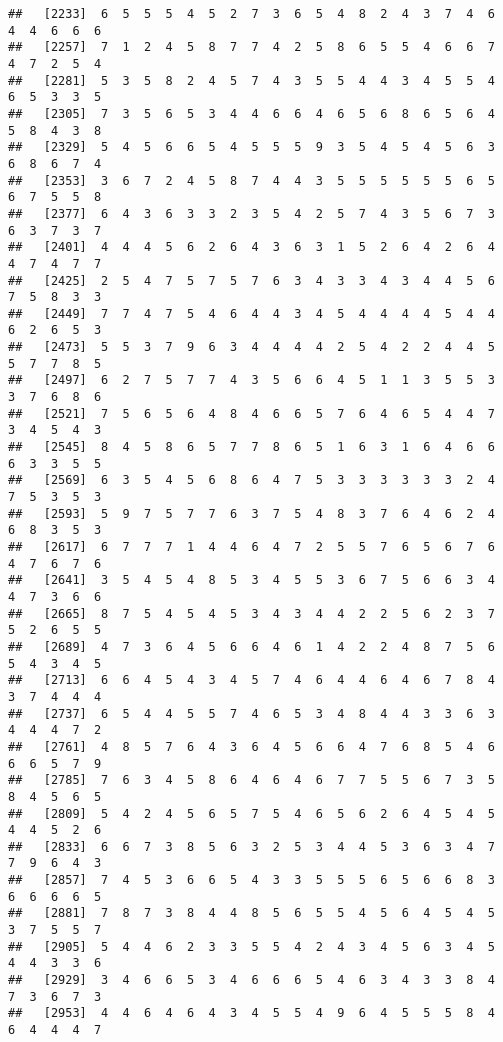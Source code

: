 \documentclass[
]{book}
\begin{document}
\begin{verbatim}
##   [2233]  6  5  5  5  4  5  2  7  3  6  5  4  8  2  4  3  7  4  6  4  4  6  6  6
##   [2257]  7  1  2  4  5  8  7  7  4  2  5  8  6  5  5  4  6  6  7  4  7  2  5  4
##   [2281]  5  3  5  8  2  4  5  7  4  3  5  5  4  4  3  4  5  5  4  6  5  3  3  5
##   [2305]  7  3  5  6  5  3  4  4  6  6  4  6  5  6  8  6  5  6  4  5  8  4  3  8
##   [2329]  5  4  5  6  6  5  4  5  5  5  9  3  5  4  5  4  5  6  3  6  8  6  7  4
##   [2353]  3  6  7  2  4  5  8  7  4  4  3  5  5  5  5  5  5  6  5  6  7  5  5  8
##   [2377]  6  4  3  6  3  3  2  3  5  4  2  5  7  4  3  5  6  7  3  6  3  7  3  7
##   [2401]  4  4  4  5  6  2  6  4  3  6  3  1  5  2  6  4  2  6  4  4  7  4  7  7
##   [2425]  2  5  4  7  5  7  5  7  6  3  4  3  3  4  3  4  4  5  6  7  5  8  3  3
##   [2449]  7  7  4  7  5  4  6  4  4  3  4  5  4  4  4  4  5  4  4  6  2  6  5  3
##   [2473]  5  5  3  7  9  6  3  4  4  4  4  2  5  4  2  2  4  4  5  5  7  7  8  5
##   [2497]  6  2  7  5  7  7  4  3  5  6  6  4  5  1  1  3  5  5  3  3  7  6  8  6
##   [2521]  7  5  6  5  6  4  8  4  6  6  5  7  6  4  6  5  4  4  7  3  4  5  4  3
##   [2545]  8  4  5  8  6  5  7  7  8  6  5  1  6  3  1  6  4  6  6  6  3  3  5  5
##   [2569]  6  3  5  4  5  6  8  6  4  7  5  3  3  3  3  3  3  2  4  7  5  3  5  3
##   [2593]  5  9  7  5  7  7  6  3  7  5  4  8  3  7  6  4  6  2  4  6  8  3  5  3
##   [2617]  6  7  7  7  1  4  4  6  4  7  2  5  5  7  6  5  6  7  6  4  7  6  7  6
##   [2641]  3  5  4  5  4  8  5  3  4  5  5  3  6  7  5  6  6  3  4  4  7  3  6  6
##   [2665]  8  7  5  4  5  4  5  3  4  3  4  4  2  2  5  6  2  3  7  5  2  6  5  5
##   [2689]  4  7  3  6  4  5  6  6  4  6  1  4  2  2  4  8  7  5  6  5  4  3  4  5
##   [2713]  6  6  4  5  4  3  4  5  7  4  6  4  4  6  4  6  7  8  4  3  7  4  4  4
##   [2737]  6  5  4  4  5  5  7  4  6  5  3  4  8  4  4  3  3  6  3  4  4  4  7  2
##   [2761]  4  8  5  7  6  4  3  6  4  5  6  6  4  7  6  8  5  4  6  6  6  5  7  9
##   [2785]  7  6  3  4  5  8  6  4  6  4  6  7  7  5  5  6  7  3  5  8  4  5  6  5
##   [2809]  5  4  2  4  5  6  5  7  5  4  6  5  6  2  6  4  5  4  5  4  4  5  2  6
##   [2833]  6  6  7  3  8  5  6  3  2  5  3  4  4  5  3  6  3  4  7  7  9  6  4  3
##   [2857]  7  4  5  3  6  6  5  4  3  3  5  5  5  6  5  6  6  8  3  6  6  6  6  5
##   [2881]  7  8  7  3  8  4  4  8  5  6  5  5  4  5  6  4  5  4  5  3  7  5  5  7
##   [2905]  5  4  4  6  2  3  3  5  5  4  2  4  3  4  5  6  3  4  5  4  4  3  3  6
##   [2929]  3  4  6  6  5  3  4  6  6  6  5  4  6  3  4  3  3  8  4  7  3  6  7  3
##   [2953]  4  4  6  4  6  4  3  4  5  5  4  9  6  4  5  5  5  8  4  6  4  4  4  7

\end{verbatim}
\end{document}
